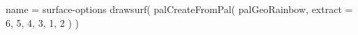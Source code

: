 \documentclass{standalone}
\begin{document}
\begin{luadraw*}{name = surface-options}
drawsurf(
  palCreateFromPal(
    palGeoRainbow,
    {extract = {6, 5, 4, 3, 1, 2}}
  )
)
\end{luadraw*}
\end{document}
